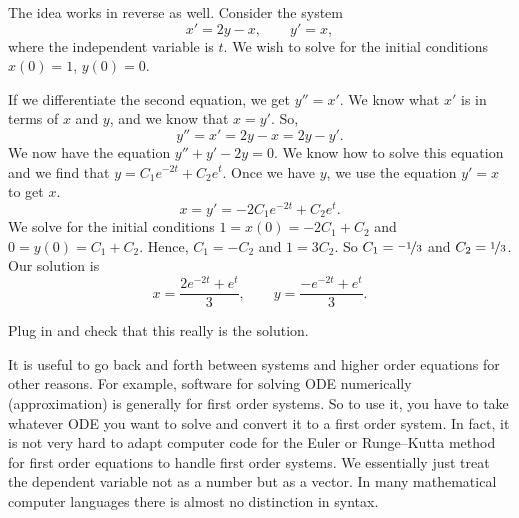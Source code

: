 \documentclass{ximera}
\begin{document}
\begin{example}
    The idea works in reverse as well.  Consider the system
    \begin{equation*}
        x' = 2y-x , \qquad y' = x, 
    \end{equation*}
    where the independent variable is $t$.  We wish to solve for the initial conditions $x(0) = 1$, $y(0) =0$.
\end{example}

\begin{exampleSol}
    If we differentiate the second equation, we get $y''=x'$.  We know what $x'$ is in terms of $x$ and $y$, and we know that $x=y'$.  So,
    \begin{equation*}
        y'' = x' = 2y-x = 2y-y' .
    \end{equation*}
    We now have the equation $y''+y'-2y = 0$.  We know how to solve this equation and we find that $y = C_1 e^{-2t} + C_2 e^t$.  Once we have $y$, we use the equation $y' = x$ to get $x$.
    \begin{equation*}
        x = y' = -2 C_1 e^{-2t} + C_2 e^t .
    \end{equation*}
    We solve for the initial conditions $1 = x(0) = -2 C_1 + C_2$ and $0 = y(0) = C_1 + C_2$.  Hence, $C_1 = -C_2$ and $1 = 3C_2$. So $C_1 = \nicefrac{-1}{3}$ and $C_2 = \nicefrac{1}{3}$.  Our solution is
    \begin{equation*}
        x = \frac{2e^{-2t} + e^t}{3} ,\qquad y = \frac{-e^{-2t} + e^t}{3} .
    \end{equation*}
\end{exampleSol}

\begin{exercise}
    Plug in and check that this really is the solution.
\end{exercise}

It is useful to go back and forth between systems and higher order equations for other reasons.  For example, software for solving ODE numerically (approximation) is generally for first order systems.  So to use it, you have to take whatever ODE you want to solve and convert it to a first order system.  In fact, it is not very hard to adapt computer code for the Euler or Runge--Kutta method for first order equations to handle first order systems.  We essentially just treat the dependent variable not as a number but as a vector.  In many mathematical computer languages there is almost no distinction in syntax.

\end{document}

